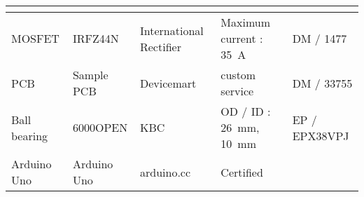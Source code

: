 \begin{landscape}
\begin{table}[h]
\begin{center}
\begin{tabular}{m{}||m{}|m{}|m{}|m{}}
			
			\hline
			\multicolumn{5}{l}{\Anta} \\ \hline
			MOSFET & IRFZ44N & {\small International Rectifier} & Maximum current : \SI{35}{\ampere} & DM / 1477 \\
			\hline
			PCB & Sample PCB & Devicemart & custom service & DM / 33755 \\
			\hline
			Ball bearing & 6000OPEN & KBC & OD / ID : \SI{26}{\milli\meter}, \SI{10}{\milli\meter} & EP / EPX38VPJ \\
			\hline
			Arduino Uno & Arduino Uno & arduino.cc & Certified & \\
			\hline
		\end{tabular}
	\end{center}
\end{table}

	
\end{landscape}
